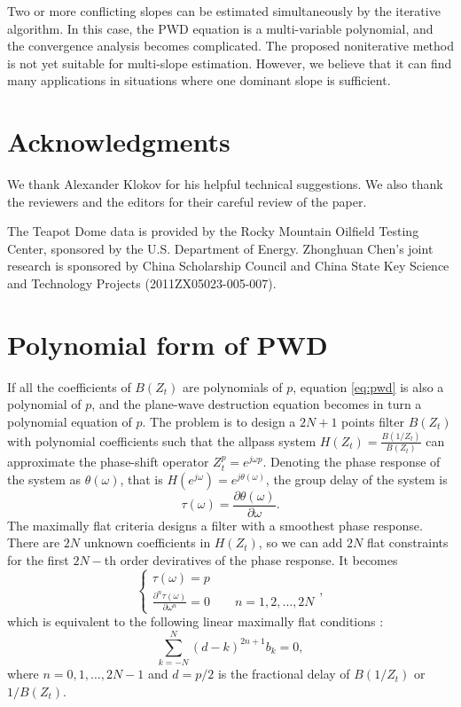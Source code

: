 Two or more conflicting slopes can be estimated simultaneously by the iterative algorithm.
In this case, the PWD equation is a multi-variable polynomial,
and the convergence analysis becomes complicated.
The proposed noniterative method is not yet suitable for multi-slope estimation.
However, we believe that it can find many applications in situations 
where one dominant slope is sufficient.


\section{Acknowledgments}

We thank Alexander Klokov for his helpful technical suggestions.
We also thank the reviewers and the editors for 
their careful review of the paper.

The Teapot Dome data is provided by the Rocky Mountain Oilfield Testing Center,
sponsored by the U.S. Department of Energy.
Zhonghuan Chen's joint research is sponsored by China Scholarship Council
and China State Key Science and Technology Projects (2011ZX05023-005-007).

\appendix
\section{Polynomial form of PWD}

If all the coefficients of $B(Z_t)$ are polynomials of $p$,
equation \ref{eq:pwd} is also a polynomial of $p$,
and the plane-wave destruction equation becomes 
in turn a polynomial equation of $p$.
The problem is to design a $2N+1$ points filter $B(Z_t)$ 
with polynomial coefficients
such that the allpass system $H(Z_t)=\frac{B(1/Z_t)}{B(Z_t)}$ can approximate 
the phase-shift operator $Z_t^p=e^{j\omega p}$.
Denoting the phase response of the system as $\theta(\omega)$,
that is $H(e^{j\omega})=e^{j\theta(\omega)}$,
the group delay of the system is
\begin{equation}
\tau(\omega)=\frac{\partial \theta(\omega)}{\partial \omega}.
\end{equation}
The maximally flat criteria designs a filter 
with a smoothest phase response. 
There are $2N$ unknown coefficients in $H(Z_t)$,
so we can add $2N$ flat constraints for the first $2N-$th order deviratives
of the phase response. 
It becomes
\cite[~equation 7]{zhang2009maxflat}
\begin{equation}
\left\{\begin{array}{l}
\tau(\omega)=p \\
\displaystyle{\frac{\partial^n\tau(\omega)}{\partial \omega^n}}=0
\qquad n=1,2,\dots,2N
\end{array}\right.,
\end{equation}
which is equivalent to the following linear maximally flat conditions
\cite[]{thiran1971recursive}:
\begin{equation}\label{eq:mf:cond}
\sum_{k=-N}^N (d-k)^{2n+1}b_k =0,
\end{equation}
where $n=0,1,\dots,2N-1$ and 
$d=p/2$ is the fractional delay of $B(1/Z_t)$ or $1/B(Z_t)$.

